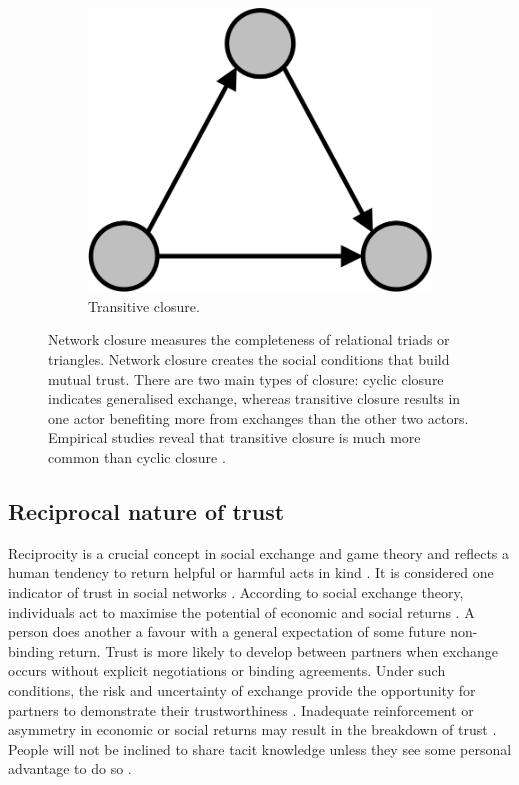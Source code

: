 \begin{figure}[hbt!]
\begin{subfigure}[b]{0.25\textwidth}
\includegraphics[width = \textwidth]{Images/T_Closure.png}
\caption{{Transitive closure.}}
\end{subfigure}
\caption[Network closure measures the completeness of relational triads]{Network closure measures the completeness of relational triads or triangles. Network closure creates the social conditions that build mutual trust\citep{coleman1990foundations}. There are two main types of closure: cyclic closure indicates generalised exchange, whereas transitive closure results in one actor benefiting more from exchanges than the other two actors. Empirical studies reveal that transitive closure is much more common than cyclic closure \citep{davis1967structure}.}
\label{fig:closure}
\end{figure}

\subsection{Reciprocal nature of trust}

Reciprocity is a crucial concept in social exchange and game theory and reflects a human tendency to return helpful or harmful acts in kind \citep{nowak2005evolution}. It is considered one indicator of trust in social networks \citep{blau1964exchange, rempel1985trust, lusher2012trust, cropanzano2016social}. According to social exchange theory, individuals act to maximise the potential of economic and social returns \citep{homans1961social, blau1964exchange}. A person does another a favour with a general expectation of some future non-binding return. Trust is more likely to develop between partners when exchange occurs without explicit negotiations or binding agreements. Under such conditions, the risk and uncertainty of exchange provide the opportunity for partners to demonstrate their trustworthiness \citep{molm2000risk}. Inadequate reinforcement or asymmetry in economic or social returns may result in the breakdown of trust \citep{homans1961social}. People will not be inclined to share tacit knowledge unless they see some personal advantage to do so \citep{yang2006knowledge, singh2019territoriality}. \medskip

